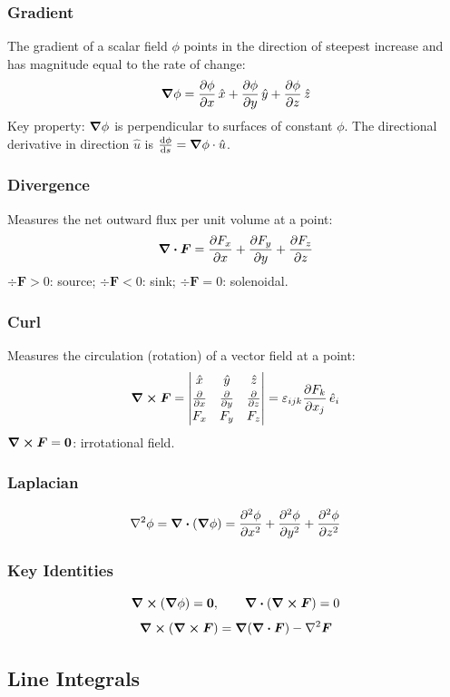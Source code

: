 \documentclass[11pt, letterpaper]{article}
\theoremstyle{plain}
\newcommand{\vv}[1]{\bm{#1}}
\begin{document}
\subsubsection*{Gradient}
The gradient of a scalar field $\phi$ points in the direction of steepest
increase and has magnitude equal to the rate of change:
\[
    \grad\phi = \pdv{\phi}{x}\,\hat{x} + \pdv{\phi}{y}\,\hat{y}
              + \pdv{\phi}{z}\,\hat{z}
\]
Key property: $\grad\phi$ is perpendicular to surfaces of constant $\phi$.
The directional derivative in direction $\hat{u}$ is $\dv{\phi}{s} = \grad\phi\cdot\hat{u}$.

\subsubsection*{Divergence}
Measures the net outward flux per unit volume at a point:
\[
    \div\vv{F} = \pdv{F_x}{x} + \pdv{F_y}{y} + \pdv{F_z}{z}
\]
$\div\vv{F} > 0$: source; $\div\vv{F} < 0$: sink; $\div\vv{F} = 0$: solenoidal.

\subsubsection*{Curl}
Measures the circulation (rotation) of a vector field at a point:
\[
    \curl\vv{F} = \begin{vmatrix}
        \hat{x} & \hat{y} & \hat{z} \\[2pt]
        \pdv{}{x} & \pdv{}{y} & \pdv{}{z} \\[2pt]
        F_x & F_y & F_z
    \end{vmatrix}
    = \varepsilon_{ijk}\pdv{F_k}{x_j}\,\hat{e}_i
\]
$\curl\vv{F} = \vv{0}$: irrotational field.

\subsubsection*{Laplacian}
\[
    \nabla^2\phi = \div(\grad\phi)
    = \pdv[2]{\phi}{x} + \pdv[2]{\phi}{y} + \pdv[2]{\phi}{z}
\]

\subsubsection*{Key Identities}
\[
    \curl(\grad\phi) = \vv{0}, \qquad
    \div(\curl\vv{F}) = 0
\]
\[
    \curl(\curl\vv{F}) = \grad(\div\vv{F}) - \nabla^2\vv{F}
\]


\subsection{Line Integrals}
\end{document}

